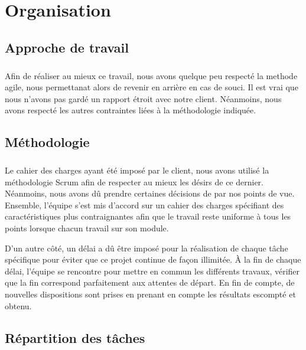 \chapter{Organisation}
        \section{Approche de travail}
\paragraph{}
Afin de réaliser au mieux ce travail, nous avons quelque peu respecté la methode agile,
nous permettanat alors de revenir en arrière en cas de souci. Il est vrai que nous
n'avons pas gardé un rapport étroit avec notre client. Néanmoins, nous avons respecté 
les autres contraintes liées à la méthodologie indiquée.
        \section{Méthodologie}
\paragraph{}
Le cahier des charges ayant été imposé par le client, nous avons utilisé la méthodologie
Scrum afin de respecter au mieux les désirs de ce dernier. Néanmoins, nous avons dû prendre
certaines décisions de par nos points de vue. Ensemble, l'équipe s'est mis d'accord sur un
cahier des charges spécifiant des caractéristiques plus contraignantes afin que le travail
reste uniforme à tous les points lorsque chacun travail sur son module. \par 
D'un autre côté, un délai a dû être imposé pour la réalisation de chaque tâche spécifique
pour éviter que ce projet continue de façon illimitée. À la fin de chaque délai, l'équipe
se rencontre pour mettre en commun les différents travaux, vérifier que la fin correspond
parfaitement aux attentes de départ. En fin de compte, de nouvelles dispositions sont 
prises en prenant en compte les résultats escompté et obtenu.
        \section{Répartition des tâches}
